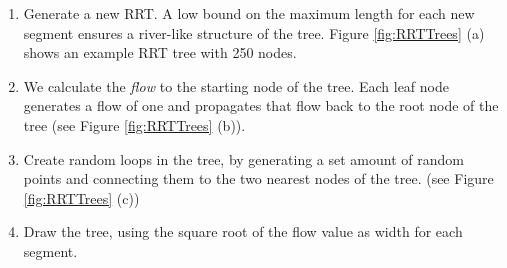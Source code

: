 \begin{enumerate}
    \item Generate a new RRT. A low bound on the maximum length for each new segment ensures a river-like structure of the tree. Figure \ref{fig:RRTTrees} (a) shows an example RRT tree with 250 nodes.
    \item We calculate the \textit{flow} to the starting node of the tree. Each leaf node generates a flow of one and propagates that flow back to the root node of the tree (see Figure \ref{fig:RRTTrees} (b)).
    \item Create random loops in the tree, by generating a set amount of random points and connecting them to the two nearest nodes of the tree. (see Figure \ref{fig:RRTTrees} (c))
    \item Draw the tree, using the square root of the flow value as width for each segment.
\end{enumerate}

